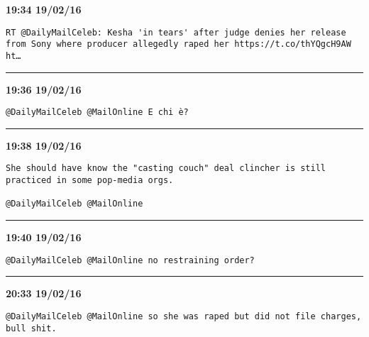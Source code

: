 \begin{adjustwidth}{0cm}{0cm}
\footnotesize \textbf{19:34 19/02/16}

\begin{lstlisting}[breaklines, breakatwhitespace, basicstyle=\small, frame=leftline]
RT @DailyMailCeleb: Kesha 'in tears' after judge denies her release from Sony where producer allegedly raped her https://t.co/thYQgcH9AW ht…
\end{lstlisting}
\end{adjustwidth}

\hrule%

\begin{adjustwidth}{2cm}{0cm}
\footnotesize \textbf{19:36 19/02/16}

\begin{lstlisting}[breaklines, breakatwhitespace, basicstyle=\small, frame=leftline]
@DailyMailCeleb @MailOnline E chi è?
\end{lstlisting}
\end{adjustwidth}

\hrule%

\begin{adjustwidth}{2cm}{0cm}
\footnotesize \textbf{19:38 19/02/16}

\begin{lstlisting}[breaklines, breakatwhitespace, basicstyle=\small, frame=leftline]
She should have know the "casting couch" deal clincher is still practiced in some pop-media orgs.

@DailyMailCeleb @MailOnline
\end{lstlisting}
\end{adjustwidth}

\hrule%

\begin{adjustwidth}{2cm}{0cm}
\footnotesize \textbf{19:40 19/02/16}

\begin{lstlisting}[breaklines, breakatwhitespace, basicstyle=\small, frame=leftline]
@DailyMailCeleb @MailOnline no restraining order?
\end{lstlisting}
\end{adjustwidth}

\hrule%

\begin{adjustwidth}{2cm}{0cm}
\footnotesize \textbf{20:33 19/02/16}

\begin{lstlisting}[breaklines, breakatwhitespace, basicstyle=\small, frame=leftline]
@DailyMailCeleb @MailOnline so she was raped but did not file charges, bull shit.
\end{lstlisting}
\end{adjustwidth}

